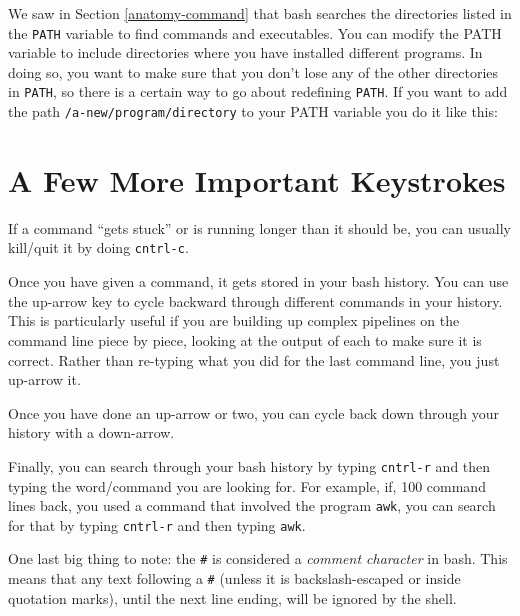 \documentclass[]{krantz}
\makeatletter
\newenvironment{Shaded}{\begin{snugshade}}{\end{snugshade}}
\newcommand{\NormalTok}[1]{#1}
\newcommand{\VariableTok}[1]{\textcolor[rgb]{0,0,0}{#1}}
\newenvironment{kframe}{%
\medskip{}
\setlength{\fboxsep}{.8em}
 \def\at@end@of@kframe{}%
 \ifinner\ifhmode%
  \def\at@end@of@kframe{\end{minipage}}%
  \begin{minipage}{\columnwidth}%
 \fi\fi%
 \def\FrameCommand##1{\hskip\@totalleftmargin \hskip-\fboxsep
 \colorbox{shadecolor}{##1}\hskip-\fboxsep
     \hskip-\linewidth \hskip-\@totalleftmargin \hskip\columnwidth}%
 \MakeFramed {\advance\hsize-\width
   \@totalleftmargin\z@ \linewidth\hsize
   \@setminipage}}%
 {\par\unskip\endMakeFramed%
 \at@end@of@kframe}
\renewenvironment{Shaded}{\begin{kframe}}{\end{kframe}}
\makeatother
\begin{document}
We saw in Section \ref{anatomy-command} that bash searches the directories listed in the
\texttt{PATH} variable to find commands and executables. You can modify the PATH variable to include
directories where you have installed different programs. In doing so, you want to make sure
that you don't lose any of the other directories in \texttt{PATH}, so there is a certain way to
go about redefining \texttt{PATH}. If you want to add the path \texttt{/a-new/program/directory} to your
PATH variable you do it like this:

\begin{Shaded}
\end{Shaded}

\hypertarget{a-few-more-important-keystrokes}{%
\section{A Few More Important Keystrokes}\label{a-few-more-important-keystrokes}}

If a command ``gets stuck'' or is running longer than it should be, you can usually
kill/quit it by doing \texttt{cntrl-c}.

Once you have given a command, it gets stored in your bash history. You can use the
up-arrow key to cycle backward through different commands in your history. This is particularly
useful if you are building up complex pipelines on the command line piece by piece, looking at
the output of each to make sure it is correct. Rather than re-typing what you did for the last
command line, you just up-arrow it.

Once you have done an up-arrow or two, you can cycle back down through your history with
a down-arrow.

Finally, you can search through your bash history by typing \texttt{cntrl-r} and then typing
the word/command you are looking for. For example, if, 100 command lines back, you
used a command that involved the program \texttt{awk}, you can search for that by typing
\texttt{cntrl-r} and then typing \texttt{awk}.

One last big thing to note: the \texttt{\#} is considered a \emph{comment character} in bash.
This means that any text following a \texttt{\#} (unless it is backslash-escaped or inside quotation marks),
until the next line ending,
will be ignored by the shell.
\end{document}
